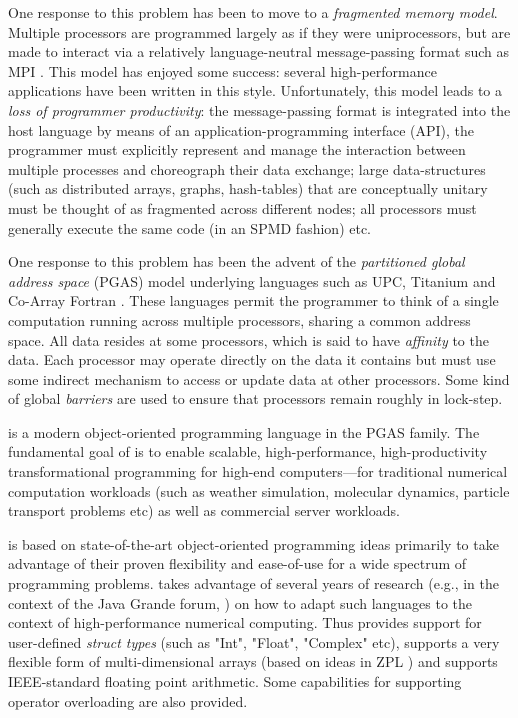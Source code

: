 One response to this problem has been to move to a {\em fragmented memory
  model}. Multiple processors are programmed largely as if they were
uniprocessors, but are made to interact via a relatively language-neutral
message-passing format such as MPI \cite{mpi}. This model has enjoyed some
success: several high-performance applications have been written in this
style. Unfortunately, this model leads to a {\em loss of programmer
  productivity}: the message-passing format is integrated into the host
language by means of an application-programming interface (API), the
programmer must explicitly represent and manage the interaction between
multiple processes and choreograph their data exchange; large data-structures
(such as distributed arrays, graphs, hash-tables) that are conceptually
unitary must be thought of as fragmented across different nodes; all
processors must generally execute the same code (in an SPMD fashion) etc.

One response to this problem has been the advent of the {\em
partitioned global address space} (PGAS) model underlying languages
such as UPC, Titanium and Co-Array Fortran \cite{pgas,titanium}. These
languages permit the programmer to think of a single computation
running across multiple processors, sharing a common address
space. All data resides at some processors, which is said to have {\em
affinity} to the data.  Each processor may operate directly on the
data it contains but must use some indirect mechanism to access or
update data at other processors. Some kind of global {\em barriers}
are used to ensure that processors remain roughly in lock-step.

\Xten{} is a modern object-oriented programming language
in the PGAS family. The fundamental goal of \Xten{} is to enable
scalable, high-performance, high-productivity transformational
programming for high-end computers---for traditional numerical
computation workloads (such as weather simulation, molecular dynamics,
particle transport problems etc) as well as commercial server
workloads.

\Xten{} is based on state-of-the-art object-oriented
programming ideas primarily to take advantage of their proven
flexibility and ease-of-use for a wide spectrum of programming
problems. \Xten{} takes advantage of several years of research (e.g.,
in the context of the Java Grande forum,
\cite{moreira00java,kava}) on how to adapt such languages to the context of
high-performance numerical computing. Thus \Xten{} provides support
for user-defined {\em struct types} (such as \xcd"Int", \xcd"Float",
\xcd"Complex" etc), supports a very
flexible form of multi-dimensional arrays (based on ideas in ZPL
\cite{zpl}) and supports IEEE-standard floating point arithmetic.
Some capabilities for supporting operator overloading are also provided.

